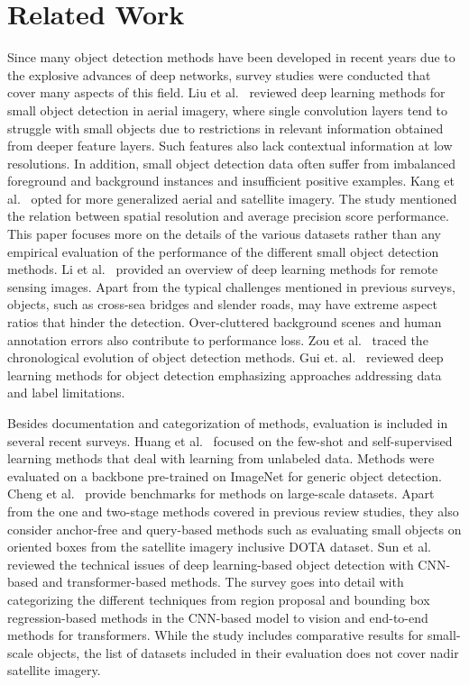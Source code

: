 \section{Related Work
\label{sec:RelatedWork}
}


Since many object detection methods have been developed in recent years due to the explosive advances of deep networks, survey studies were conducted that cover many aspects of this field. Liu et al.~\cite{2021Liu} reviewed deep learning methods for small object detection in aerial imagery, where single convolution layers tend to struggle with small objects due to restrictions in relevant information obtained from deeper feature layers. Such features also lack contextual information at low resolutions. In addition, small object detection data often suffer from imbalanced foreground and background instances and insufficient positive examples. 
Kang et al.~\cite{2022Kang} opted for more generalized aerial and satellite imagery. The study mentioned the relation between spatial resolution and average precision score performance.
This paper focuses more on the details of the various datasets rather than any empirical evaluation of the performance of the different small object detection methods.
Li et al.~\cite{2022Li} provided an overview of deep learning methods for remote sensing images. Apart from the typical challenges mentioned in previous surveys, objects, such as cross-sea bridges and slender roads, may have extreme aspect ratios that hinder the detection. Over-cluttered background scenes and human annotation errors also contribute to performance loss.
Zou et al.~\cite{2023Zou} traced the chronological evolution of object detection methods. %
Gui et. al.~\cite{2024Gui} reviewed deep learning methods for object detection emphasizing approaches addressing data and label limitations.

Besides documentation and categorization of methods, evaluation is included in several recent surveys. Huang et al.~\cite{2023Huang} focused on the few-shot and self-supervised learning methods that deal with learning from unlabeled data. Methods were evaluated on a backbone pre-trained on ImageNet for generic object detection.
Cheng et al.~\cite{2023Cheng} provide benchmarks for methods on large-scale datasets. Apart from the one and two-stage methods covered in previous review studies, they also consider anchor-free and query-based methods such as evaluating small objects on oriented boxes from the satellite imagery inclusive DOTA dataset. 
Sun et al.~\cite{2024Sun} reviewed the technical issues of deep learning-based object detection with CNN-based and transformer-based methods. The survey goes into detail with categorizing the different techniques from region proposal and bounding box regression-based methods in the CNN-based model to vision and end-to-end methods for transformers.
While the study includes comparative results for small-scale objects, the list of datasets included in their evaluation does not cover nadir satellite imagery.

